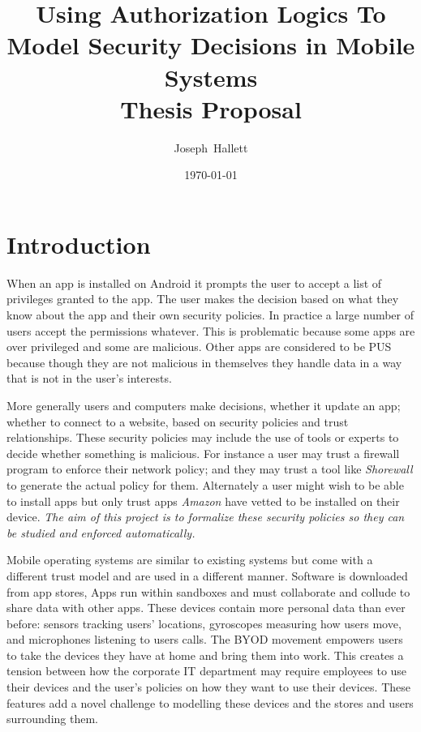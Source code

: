 \documentclass[a4paper]{article}
\title{Using Authorization Logics To Model Security Decisions in Mobile
  Systems\\\vspace{1em}Thesis Proposal}
\author{Joseph~Hallett}
\date\today
\begin{document}
\maketitle
\setcounter{tocdepth}{3}
\tableofcontents
\pagebreak

\section{Introduction}

When an app is installed on Android it prompts the user to accept a list of
privileges granted to the app.  The user makes the decision based on what they
know about the app and their own security policies.  In practice a large number
of users accept the permissions whatever.  This is problematic because some apps
are over privileged\cite{Felt:2011kj} and some are malicious\cite{Zhou:2012cf}.
Other apps are considered to be \ac{PUS} because though they are not malicious
in themselves they handle data in a way that is not in the user's interests.

More generally users and computers make decisions, whether it update an app;
whether to connect to a website, based on security policies and trust
relationships.  These security policies may include the use of tools or experts
to decide whether something is malicious.  For instance a user may trust a
firewall program to enforce their network policy; and they may trust a tool like
\emph{Shorewall} to generate the actual policy for them.  Alternately a user
might wish to be able to install apps but only trust apps \emph{Amazon} have
vetted to be installed on their device.  \emph{The aim of this project is to
  formalize these security policies so they can be studied and enforced
  automatically.}

Mobile operating systems are similar to existing systems but come with a
different trust model and are used in a different manner.  Software is
downloaded from app stores, Apps run within sandboxes and must collaborate and
collude to share data with other apps. These devices contain more personal data
than ever before: sensors tracking users' locations,  gyroscopes measuring how
users move, and microphones listening to users calls.  The \ac{BYOD} movement
empowers users to take the devices they have at home and bring them into work.
This creates a tension between how the corporate IT department may require
employees to use their devices and the user's policies on how they want to use
their devices.  These features add a novel challenge to modelling these devices
and the stores and users surrounding them.  
\end{document}
